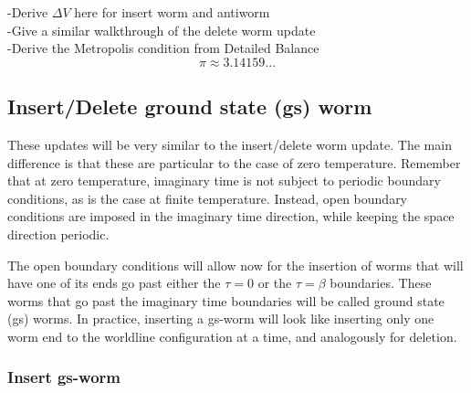 \documentclass[12pt, two sided]{article}
\begin{document}
    {\color{red}-Derive $\Delta V$ here for insert worm and antiworm} \\ 
    {\color{red}-Give a similar walkthrough of the delete worm update} \\
    {\color{red}-Derive the Metropolis condition from Detailed Balance} \\
%
    \begin{equation}
    \pi \approx 3.14159...
    \label{eq:detailed_balance}
    \end{equation}

    \subsection{Insert/Delete ground state (gs) worm}
    These updates will be very similar to the insert/delete worm update. The main difference is that these are particular to the case of zero temperature. Remember that at zero temperature, imaginary time is not subject to periodic boundary conditions, as is the case at finite temperature. Instead, open boundary conditions are imposed in the imaginary time direction, while keeping the space direction periodic. 

    The open boundary conditions will allow now for the insertion of worms that will have one of its ends go past either the $\tau = 0$ or the $\tau = \beta$ boundaries. These worms that go past the imaginary time boundaries will be called ground state (gs) worms. In practice, inserting a gs-worm will look like inserting only one worm end to the worldline configuration at a time, and analogously for deletion. 

    \subsubsection{Insert gs-worm}
\end{document}
